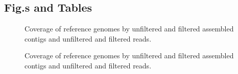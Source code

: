 \documentclass[11pt]{article} %
\begin{document}
\subsection{Fig.s and Tables}

\begin{landscape}
\begin{figure}[h!]
\caption{Coverage of reference genomes by unfiltered and filtered assembled contigs and unfiltered and filtered reads.}
\label{coverage1}
\end{figure}
\end{landscape}

\begin{landscape}
\begin{figure}[h!]
\caption{Coverage of reference genomes by unfiltered and filtered assembled contigs and unfiltered and filtered reads.}
\label{coverage2}
\end{figure}
\end{landscape}
\end{document}
